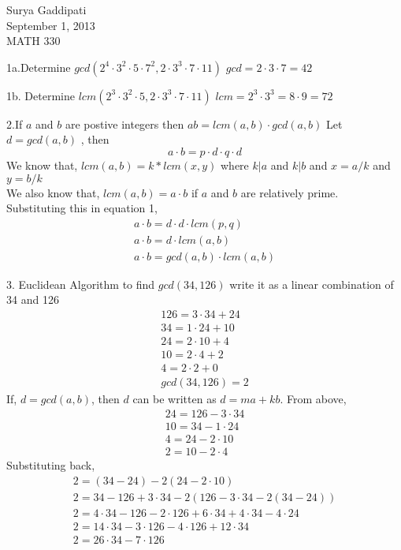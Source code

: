 \documentclass[12pt]{article}
\newenvironment{faq}{\begin{description}[style=nextline]}{\end{description}}
\begin{document}
 

Surya Gaddipati\\
September 1, 2013\\
MATH 330 
\begin{faq}
\item[1a.Determine $gcd(2^4 \cdot  3^2 \cdot 5 \cdot 7^2, 2 \cdot 3^3 \cdot 7 \cdot 11)$]
  $gcd= 2 \cdot 3 \cdot 7 = 42$
\item[1b. Determine $lcm(2^3 \cdot  3^2 \cdot 5 , 2 \cdot 3^3 \cdot 7 \cdot 11)$]
  $lcm= 2^3 \cdot 3^3  = 8 \cdot 9 = 72$

\item[2.If $a$ and $b$ are postive integers then $ab = lcm(a,b)\cdot gcd(a,b)$]
  Let $d = gcd(a,b)$ , then
  \begin{equation}
    a\cdot b = p\cdot d \cdot q\cdot d
  \end{equation}
  We know that,
  $lcm(a,b) = k * lcm(x,y)$ where $k|a$ and $k|b$ and $x=a/k$ and $y=b/k$ \\
  We also know that, $lcm(a,b) = a\cdot b$ if $a$ and $b$ are relatively prime.\\
  Substituting this in equation 1, 
  \begin{align}
    a\cdot b = d \cdot d \cdot lcm(p,q)  \\
    a\cdot b = d \cdot lcm(a,b) \\ 
    a\cdot b = gcd(a,b) \cdot lcm(a,b) 
  \end{align}
\item[3. Euclidean Algorithm to find $gcd(34,126)$ write it as a linear combination of 34 and 126]
  \begin{align}
    126 = 3 \cdot 34 + 24 \\
    34 = 1 \cdot 24 + 10 \\
    24 = 2 \cdot 10 + 4 \\
    10 = 2 \cdot 4 + 2 \\
    4 = 2 \cdot 2 + 0\\
    gcd(34,126) = 2 
  \end{align}
  If, $d = gcd(a,b)$, then $d$ can be written as $d = ma + kb$. From above,
  \begin{align}
    24 = 126 - 3 \cdot 34 \\
    10 = 34 - 1 \cdot 24 \\
    4 = 24 - 2 \cdot 10 \\
    2 = 10 - 2 \cdot 4
  \end{align}
  Substituting back,
  \begin{align}
    2 = ( 34 -24 ) - 2(24 - 2 \cdot 10) \\
    2 = 34 - 126 + 3 \cdot 34  -2 ( 126 - 3 \cdot 34 - 2( 34 -24)) \\
    2  = 4 \cdot 34  - 126  - 2\cdot126 + 6\cdot34 + 4\cdot34 - 4\cdot24 \\
    2 = 14\cdot34 - 3\cdot126 - 4\cdot 126 + 12\cdot34 \\
    2 = 26\cdot34 - 7\cdot126
  \end{align}


\end{faq}
\end{document}
